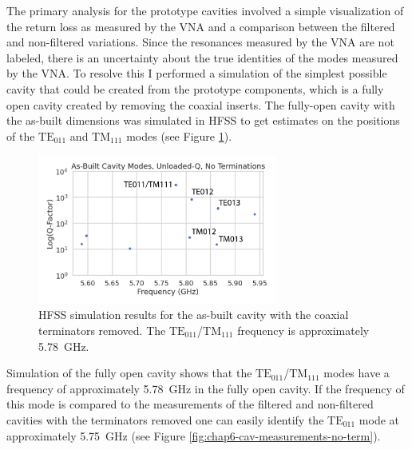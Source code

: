 The primary analysis for the prototype cavities involved a simple visualization of the return loss as measured by the VNA and a comparison between the filtered and non-filtered variations. Since the resonances measured by the VNA are not labeled, there is an uncertainty about the true identities of the modes measured by the VNA. To resolve this I performed a simulation of the simplest possible cavity that could be created from the prototype components, which is a fully open cavity created by removing the coaxial inserts. The fully-open cavity with the as-built dimensions was simulated in HFSS to get estimates on the positions of the $\mathrm{TE}_{011}$ and $\mathrm{TM}_{111}$ modes (see Figure \ref{fig:chap6-fully-open-cavity-sim}).

\begin{figure}[htbp]
    \centering
    \includegraphics*[width=0.7\textwidth]{figs/Chapter-6/230612_simulated_toy_cav_no_term_modes_annotated.png}
    \caption{\label{fig:chap6-fully-open-cavity-sim} HFSS simulation results for the as-built cavity with the coaxial terminators removed. The $\mathrm{TE}_{011}$/$\mathrm{TM}_{111}$ frequency is approximately 5.78~GHz.}
\end{figure}

Simulation of the fully open cavity shows that the $\mathrm{TE}_{011}$/$\mathrm{TM}_{111}$ modes have a frequency of approximately 5.78~GHz in the fully open cavity. If the frequency of this mode is compared to the measurements of the filtered and non-filtered cavities with the terminators removed one can easily identify the $\mathrm{TE}_{011}$ mode at approximately 5.75~GHz (see Figure \ref{fig:chap6-cav-measurements-no-term}).

